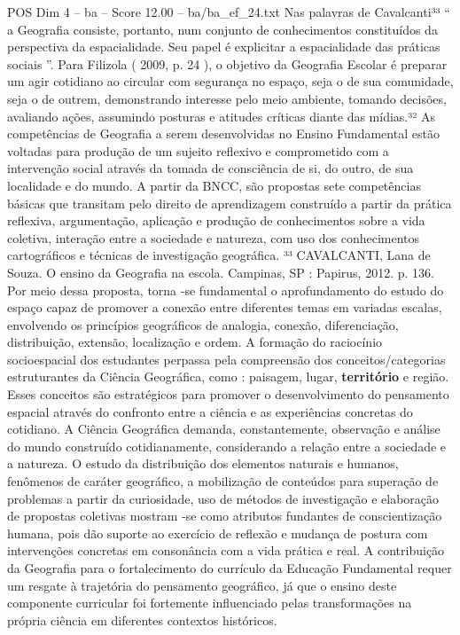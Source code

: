 \begin{textsample}{POS Dim 4 – ba – Score 12.00 – ba/ba\_ef\_24.txt}
Nas palavras de Cavalcanti³³ “ a Geografia consiste, portanto, num conjunto de conhecimentos constituídos da perspectiva da espacialidade.
Seu papel é explicitar a espacialidade das práticas sociais ”.
Para Filizola ( 2009, p. 24 ), o objetivo da Geografia Escolar é preparar um agir cotidiano ao circular com segurança no espaço, seja o de sua comunidade, seja o de outrem, demonstrando interesse pelo meio ambiente, tomando decisões, avaliando ações, assumindo posturas e atitudes críticas diante das mídias.³² As competências de Geografia a serem desenvolvidas no Ensino Fundamental estão voltadas para produção de um sujeito reflexivo e comprometido com a intervenção social através da tomada de consciência de si, do outro, de sua localidade e do mundo.
A partir da BNCC, são propostas sete competências básicas que transitam pelo direito de aprendizagem construído a partir da prática reflexiva, argumentação, aplicação e produção de conhecimentos sobre a vida coletiva, interação entre a sociedade e natureza, com uso dos conhecimentos cartográficos e técnicas de investigação geográfica. ³³ CAVALCANTI, Lana de Souza.
O ensino da Geografia na escola.
Campinas, SP : Papirus, 2012. p. 136.
Por meio dessa proposta, torna -se fundamental o aprofundamento do estudo do espaço capaz de promover a conexão entre diferentes temas em variadas escalas, envolvendo os princípios geográficos de analogia, conexão, diferenciação, distribuição, extensão, localização e ordem.
A formação do raciocínio socioespacial dos estudantes perpassa pela compreensão dos conceitos/categorias estruturantes da Ciência Geográfica, como : paisagem, lugar, \textbf{território} e região.
Esses conceitos são estratégicos para promover o desenvolvimento do pensamento espacial através do confronto entre a ciência e as experiências concretas do cotidiano.
A Ciência Geográfica demanda, constantemente, observação e análise do mundo construído cotidianamente, considerando a relação entre a sociedade e a natureza.
O estudo da distribuição dos elementos naturais e humanos, fenômenos de caráter geográfico, a mobilização de conteúdos para superação de problemas a partir da curiosidade, uso de métodos de investigação e elaboração de propostas coletivas mostram -se como atributos fundantes de conscientização humana, pois dão suporte ao exercício de reflexão e mudança de postura com intervenções concretas em consonância com a vida prática e real.
A contribuição da Geografia para o fortalecimento do currículo da Educação Fundamental requer um resgate à trajetória do pensamento geográfico, já que o ensino deste componente curricular foi fortemente influenciado pelas transformações na própria ciência em diferentes contextos históricos.

\end{textsample}
